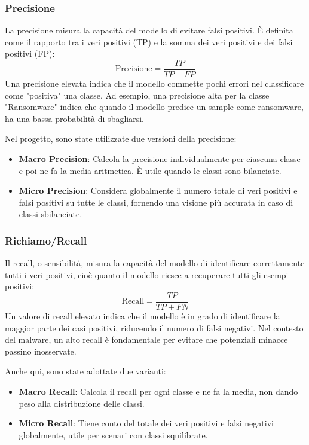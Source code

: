 \subsubsection{Precisione}
La precisione misura la capacità del modello di evitare falsi positivi. È definita come il rapporto tra i veri positivi (TP) e la somma dei veri positivi e dei falsi positivi (FP):
\[
\text{Precisione} = \frac{TP}{TP + FP}
\]
Una precisione elevata indica che il modello commette pochi errori nel classificare come "positiva" una classe. Ad esempio, una precisione alta per la classe "Ransomware" indica che quando il modello predice un sample come ransomware, ha una bassa probabilità di sbagliarsi.

Nel progetto, sono state utilizzate due versioni della precisione:
\begin{itemize}
    \item \textbf{Macro Precision}: Calcola la precisione individualmente per ciascuna classe e poi ne fa la media aritmetica. È utile quando le classi sono bilanciate.
    \item \textbf{Micro Precision}: Considera globalmente il numero totale di veri positivi e falsi positivi su tutte le classi, fornendo una visione più accurata in caso di classi sbilanciate.
\end{itemize}

\subsubsection{Richiamo/Recall}
Il recall, o sensibilità, misura la capacità del modello di identificare correttamente tutti i veri positivi, cioè quanto il modello riesce a recuperare tutti gli esempi positivi:
\[
\text{Recall} = \frac{TP}{TP + FN}
\]
Un valore di recall elevato indica che il modello è in grado di identificare la maggior parte dei casi positivi, riducendo il numero di falsi negativi. Nel contesto del malware, un alto recall è fondamentale per evitare che potenziali minacce passino inosservate.

Anche qui, sono state adottate due varianti:
\begin{itemize}
    \item \textbf{Macro Recall}: Calcola il recall per ogni classe e ne fa la media, non dando peso alla distribuzione delle classi.
    \item \textbf{Micro Recall}: Tiene conto del totale dei veri positivi e falsi negativi globalmente, utile per scenari con classi squilibrate.
\end{itemize}

